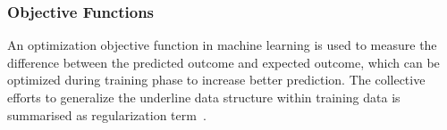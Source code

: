 \subsubsection{Objective Functions}
An optimization objective function in machine learning is used to measure the difference between the predicted outcome and expected outcome, which can be optimized during training phase to increase better prediction. The collective efforts to generalize the underline data structure within training data is summarised as regularization term~\cite{goodfellow_2015}.  